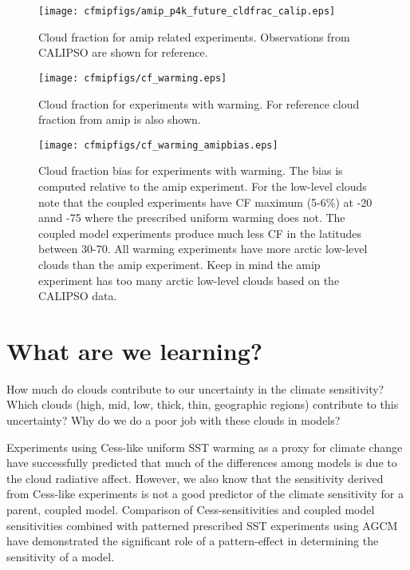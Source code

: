 \documentclass[11pt]{article}   	%
\begin{document}
\begin{figure}
  \texttt{[image: cfmipfigs/amip\_p4k\_future\_cldfrac\_calip.eps]}
  \caption{Cloud fraction for amip related experiments.  Observations from CALIPSO are shown for reference.}
  \label{fig:calipso_amip_comparison}
\end{figure}

\begin{figure}
  \texttt{[image: cfmipfigs/cf\_warming.eps]}
  \caption{Cloud fraction for experiments with warming.  For reference cloud fraction from amip is also shown.}
\end{figure}

\begin{figure}
  \texttt{[image: cfmipfigs/cf\_warming\_amipbias.eps]}
  \caption{Cloud fraction bias for experiments with warming.  The bias is computed relative to the amip experiment. 
  For the low-level clouds note that the coupled experiments have CF maximum (5-6\%) at -20 annd -75 where the prescribed uniform warming
  does not.  The coupled model experiments produce much less CF in the latitudes between 30-70.  All warming experiments have more 
  arctic low-level clouds than the amip experiment.  Keep in mind the amip experiment has too many arctic low-level clouds based
  on the CALIPSO data.}
  \label{fig:calipso_amip_comparison}
\end{figure}

\section{What are we learning?}

How much do clouds contribute to our uncertainty in the climate sensitivity?  
Which clouds (high, mid, low, thick, thin, geographic regions) contribute to this uncertainty?
Why do we do a poor job with these clouds in models?  

Experiments using Cess-like uniform SST warming as a proxy for climate change have successfully predicted that much of the differences 
among models is due to the cloud radiative affect.  However, we also know that the sensitivity derived from Cess-like experiments is not
a good predictor of the climate sensitivity for a parent, coupled model.  Comparison of Cess-sensitivities and coupled model sensitivities 
combined with patterned prescribed SST experiments using AGCM have demonstrated the significant role of a pattern-effect in determining 
the sensitivity of a model.  
\end{document}
